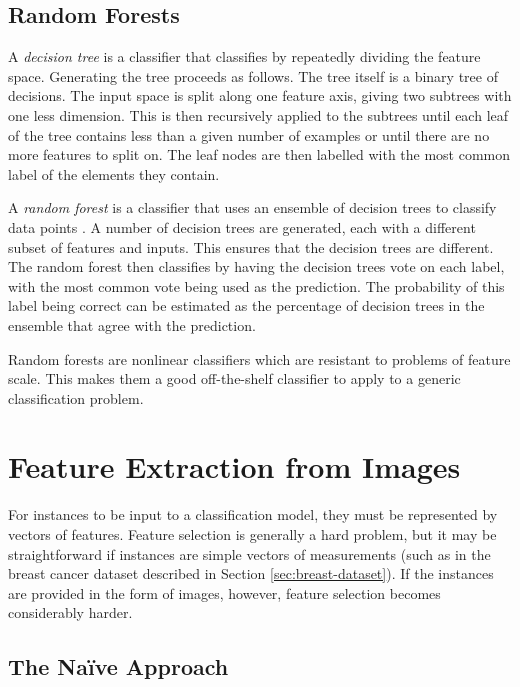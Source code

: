     \subsection{Random Forests}
    \label{sec:random-forests}

        A \emph{decision tree} is a classifier that classifies by repeatedly
        dividing the feature space. Generating the tree proceeds as follows. The
        tree itself is a binary tree of decisions. The input space is split
        along one feature axis, giving two subtrees with one less dimension.
        This is then recursively applied to the subtrees until each leaf of the
        tree contains less than a given number of examples or until there are no
        more features to split on. The leaf nodes are then labelled with the
        most common label of the elements they contain.

        A \emph{random forest} is a classifier that uses an ensemble of decision
        trees to classify data points \citep{kon16}. A number of decision trees
        are generated, each with a different subset of features and inputs. This
        ensures that the decision trees are different. The random forest then
        classifies by having the decision trees vote on each label, with the
        most common vote being used as the prediction. The probability of this
        label being correct can be estimated as the percentage of decision trees
        in the ensemble that agree with the prediction.

        Random forests are nonlinear classifiers which are resistant to problems of feature scale. This makes them a good off-the-shelf classifier to apply to a generic classification problem.

\section{Feature Extraction from Images}
\label{sec:image-feature-extraction}
    
    For instances to be input to a classification model, they must be
    represented by vectors of features. Feature selection is generally a hard
    problem, but it may be straightforward if instances are simple vectors of
    measurements (such as in the breast cancer dataset described in Section
    \ref{sec:breast-dataset}). If the instances are provided in the form of
    images, however, feature selection becomes considerably harder.

    \subsection{The Na\"ive Approach}
    \label{sec:naive-approach-image-features}

